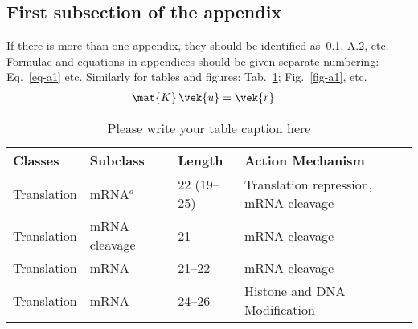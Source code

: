 \documentclass{techmech}
\begin{document}
 \subsection{First subsection of the appendix}
 \label{subsec-a1}
If there is more than one appendix, they should be identified as~\ref{subsec-a1}, A.2, etc. Formulae and equations in
appendices should be given separate numbering: Eq.~\eqref{eq-a1} etc. Similarly for tables and figures: Tab.~\ref{tab-a1}; Fig.~\ref{fig-a1}, etc.
\begin{align}
\mat{K}\,\vek{u}&=\vek{r}
\label{eq-a1}
\end{align}
\begin{table}[b!]
\caption{Please write your table caption here}
\label{tab-a1} 
\begin{tabularx}{\textwidth}{p{2cm}XXX} 
\hline%
Classes & Subclass & Length & Action Mechanism  \\
\hline
Translation & mRNA$^a$  & 22 (19--25) & Translation repression, mRNA cleavage\\
Translation & mRNA cleavage & 21 & mRNA cleavage\\
Translation & mRNA  & 21--22 & mRNA cleavage\\
Translation & mRNA  & 24--26 & Histone and DNA Modification\\
\hline
\end{tabularx}
\end{table}
\begin{figure*}[t!]
\caption{A figure in the appendix}
\label{fig-a1}
\end{figure*}




\end{document}

